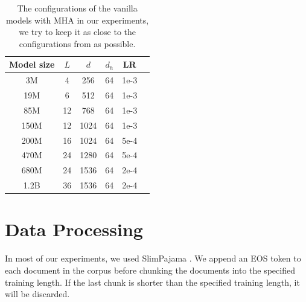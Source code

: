 \begin{table}[!t]
    \centering
    \begin{tabular}{c|ccccc}
        \toprule
        Model size & $L$ & $d$ & $d_h$ & LR \\
        \midrule

        3M   & 4  & 256  & 64 & 1e-3 \\
        19M  & 6  & 512  & 64 & 1e-3 \\
        85M  & 12 & 768  & 64 & 1e-3 \\
        150M & 12 & 1024 & 64 & 1e-3 \\
        200M & 16 & 1024 & 64 & 5e-4 \\
        470M & 24 & 1280 & 64 & 5e-4 \\
        680M & 24 & 1536 & 64 & 2e-4 \\
        1.2B & 36 & 1536 & 64 & 2e-4 \\
        \bottomrule
    \end{tabular}
    \caption{The configurations of the vanilla models with MHA in our experiments, we try to keep it as close to the configurations from \citet{pythia} as possible.}
    \label{tab:vanilla-model-configs}
\end{table}


\section{Data Processing}
\label{sec:appendix-data-processing}

In most of our experiments, we used SlimPajama \citep{slimpj}. We append an EOS token to each document in the corpus before chunking the documents into the specified training length. If the last chunk is shorter than the specified training length, it will be discarded.


